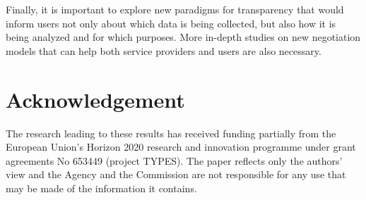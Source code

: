 Finally, it is important to explore new paradigms for transparency that would inform users not only about which data is being collected, but also how it is being analyzed and for which purposes. More in-depth studies on new negotiation models that can help both service providers and users are also necessary. 

\section{Acknowledgement}
The research leading to these results has received funding partially from the European Union's Horizon 2020 research and innovation programme under grant agreements No 653449 (project TYPES). The paper reflects only the authors' view and the Agency and the Commission are not responsible for any use that may be made of the information it contains.


